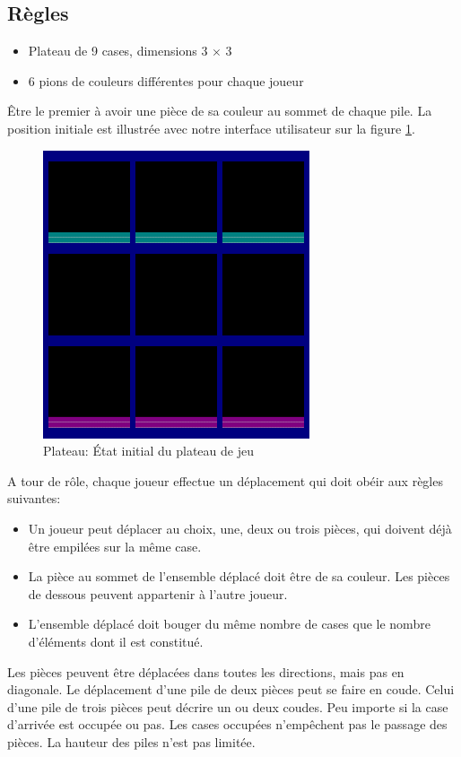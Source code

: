 \documentclass[article, backcover, french, nodocumentinfo]{upmethodology-document}
\begin{document}
		\subsection{Règles}
				\begin{itemize}
					\item Plateau de 9 cases, dimensions 3 $\times$ 3
					\item 6 pions de couleurs différentes pour chaque joueur
				\end{itemize}
				Être le premier à avoir une pièce de sa couleur au sommet de chaque pile.
				La position initiale est illustrée avec notre interface utilisateur sur la figure \ref{fig:état_initial}.
				\begin{figure}[H]
					\centering
					\includegraphics[width=0.7\textwidth]{figures/ConsoleUI}
					\caption{Plateau: État initial du plateau de jeu}
					\label{fig:état_initial}
				\end{figure}
				A tour de rôle, chaque joueur effectue un déplacement qui doit obéir aux règles suivantes:
				\begin{itemize}
					\item Un joueur peut déplacer au choix, une, deux ou trois pièces, qui doivent déjà être empilées sur la même case.
					\item La pièce au sommet de l’ensemble déplacé doit être de sa couleur. Les pièces de dessous peuvent appartenir à l’autre joueur.
					\item L’ensemble déplacé doit bouger du même nombre de cases que le nombre d’éléments dont il est constitué.
				\end{itemize}
				Les pièces peuvent être déplacées dans toutes les directions, mais pas en diagonale. Le déplacement d’une pile de deux pièces peut se faire en coude. Celui d’une pile de trois pièces peut décrire un ou deux coudes. Peu importe si la case d’arrivée est occupée ou pas. Les cases occupées n’empêchent pas le passage des pièces. La hauteur des piles n’est pas limitée.
\end{document}
